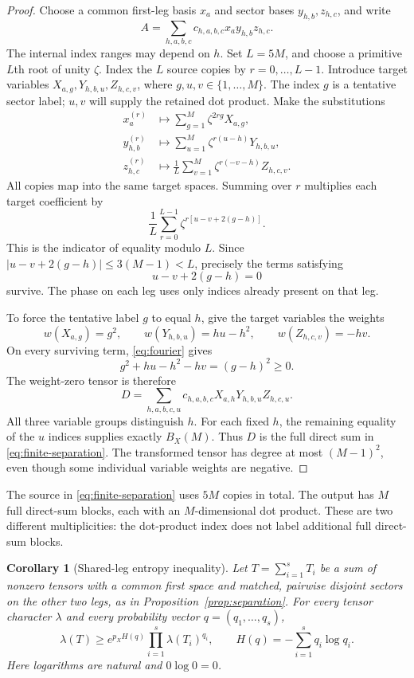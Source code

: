 \documentclass[11pt]{article}
\newtheorem{corollary}[theorem]{Corollary}
\theoremstyle{definition}
\theoremstyle{remark}
\numberwithin{equation}{section}
\begin{document}
\begin{proof}
Choose a common first-leg basis $x_a$ and sector bases $y_{h,b},z_{h,c}$,
and write
\[
 A=\sum_{h,a,b,c}c_{h,a,b,c}x_a y_{h,b}z_{h,c}.
\]
The internal index ranges may depend on $h$. Set $L=5M$, and choose a
primitive $L$th root of unity $\zeta$. Index the $L$ source copies by
$r=0,\ldots,L-1$. Introduce target variables
$X_{a,g},Y_{h,b,u},Z_{h,c,v}$, where $g,u,v\in\{1,\ldots,M\}$.
The index $g$ is a tentative sector label; $u,v$ will supply the
retained dot product. Make the substitutions
\begin{align*}
 x_a^{(r)}&\longmapsto\sum_{g=1}^M\zeta^{2rg}X_{a,g},\\
 y_{h,b}^{(r)}&\longmapsto\sum_{u=1}^M\zeta^{r(u-h)}Y_{h,b,u},\\
 z_{h,c}^{(r)}&\longmapsto\frac1L\sum_{v=1}^M
                      \zeta^{r(-v-h)}Z_{h,c,v}.
\end{align*}
All copies map into the same target spaces. Summing over $r$ multiplies
each target coefficient by
\[
 \frac1L\sum_{r=0}^{L-1}\zeta^{r[u-v+2(g-h)]}.
\]
This is the indicator of equality modulo $L$. Since
$|u-v+2(g-h)|\leq3(M-1)<L$, precisely the terms satisfying
\begin{equation}\label{eq:fourier}
 u-v+2(g-h)=0
\end{equation}
survive. The phase on each leg uses only indices already present on
that leg.

To force the tentative label $g$ to equal $h$, give the target variables
the weights
\[
 w(X_{a,g})=g^2,\qquad
 w(Y_{h,b,u})=hu-h^2,\qquad
 w(Z_{h,c,v})=-hv.
\]
On every surviving term, \eqref{eq:fourier} gives
\[
 g^2+hu-h^2-hv=(g-h)^2\geq0.
\]
The weight-zero tensor is therefore
\[
 D=\sum_{h,a,b,c,u}c_{h,a,b,c}X_{a,h}Y_{h,b,u}Z_{h,c,u}.
\]
All three variable groups distinguish $h$. For each fixed $h$, the
remaining equality of the $u$ indices supplies exactly $B_X(M)$.
Thus $D$ is the full direct sum in \eqref{eq:finite-separation}.
The transformed tensor has degree at most $(M-1)^2$, even though some
individual variable weights are negative.
\end{proof}

The source in \eqref{eq:finite-separation} uses $5M$ copies in total.
The output has $M$ full direct-sum blocks, each with an $M$-dimensional
dot product. These are two different multiplicities: the dot-product
index does not label additional full direct-sum blocks.

\begin{corollary}[Shared-leg entropy inequality]\label{cor:entropy}
Let $T=\sum_{i=1}^s T_i$ be a sum of nonzero tensors with a common first
space and matched, pairwise disjoint sectors on the other two legs, as
in Proposition~\ref{prop:separation}. For every tensor character
$\lambda$ and every probability vector $q=(q_1,\ldots,q_s)$,
\begin{equation}\label{eq:entropy}
 \lambda(T)\geq
 e^{p_X H(q)}\prod_{i=1}^s\lambda(T_i)^{q_i},
 \qquad H(q)=-\sum_{i=1}^s q_i\log q_i.
\end{equation}
Here logarithms are natural and $0\log0=0$.
\end{corollary}
\end{document}
